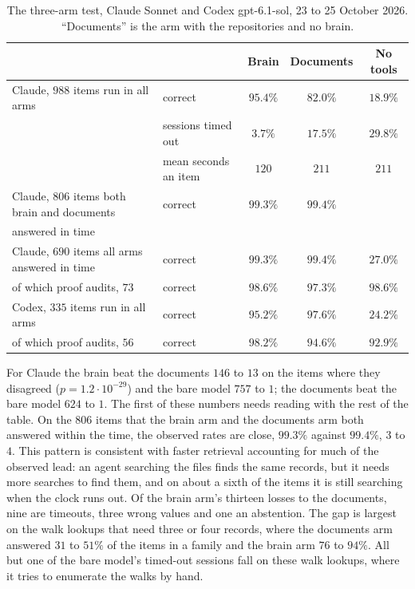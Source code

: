 \begin{table}[ht]
\centering\small
\begin{tabular}{llccc}
\toprule
 & & Brain & Documents & No tools\\
\midrule
Claude, $988$ items run in all arms & correct & $95.4\%$ & $82.0\%$ & $18.9\%$\\
 & sessions timed out & $3.7\%$ & $17.5\%$ & $29.8\%$\\
 & mean seconds an item & $120$ & $211$ & $211$\\
Claude, $806$ items both brain and documents & correct & $99.3\%$ & $99.4\%$ & \\
\quad answered in time & & & & \\
Claude, $690$ items all arms answered in time & correct & $99.3\%$ & $99.4\%$ & $27.0\%$\\
\quad of which proof audits, $73$ & correct & $98.6\%$ & $97.3\%$ & $98.6\%$\\
Codex, $335$ items run in all arms & correct & $95.2\%$ & $97.6\%$ & $24.2\%$\\
\quad of which proof audits, $56$ & correct & $98.2\%$ & $94.6\%$ & $92.9\%$\\
\bottomrule
\end{tabular}
\caption{The three-arm test, Claude Sonnet and Codex gpt-6.1-sol, 23 to 25 October 2026. ``Documents'' is the arm with the repositories and no brain.}
\label{tab:threearm}
\end{table}

For Claude the brain beat the documents $146$ to $13$ on the items where they disagreed ($p=1.2\cdot10^{-29}$) and the bare model $757$ to $1$; the documents beat the bare model $624$ to $1$. The first of these numbers needs reading with the rest of the table. On the $806$ items that the brain arm and the documents arm both answered within the time, the observed rates are close, $99.3\%$ against $99.4\%$, $3$ to $4$. This pattern is consistent with faster retrieval accounting for much of the observed lead: an agent searching the files finds the same records, but it needs more searches to find them, and on about a sixth of the items it is still searching when the clock runs out. Of the brain arm's thirteen losses to the documents, nine are timeouts, three wrong values and one an abstention. The gap is largest on the walk lookups that need three or four records, where the documents arm answered $31$ to $51\%$ of the items in a family and the brain arm $76$ to $94\%$. All but one of the bare model's timed-out sessions fall on these walk lookups, where it tries to enumerate the walks by hand.

